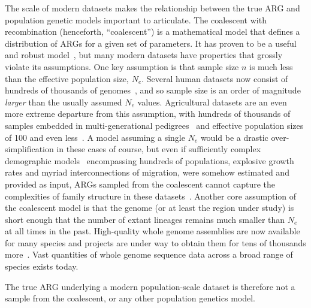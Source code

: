 \documentclass{article}
\begin{document}
The scale of modern datasets makes the
relationship between the true ARG and
population genetic models important to articulate.
The coalescent with recombination (henceforth, ``coalescent'')
is a mathematical model that defines a distribution of ARGs
for a given set of parameters.
It has proven to be a useful and robust
model~\citep{wakeley2012gene,bhaskar2014distortion,nelson2020accounting},
but many modern datasets have properties that grossly
violate its assumptions.
One key assumption is that
sample size $n$ is much less than the effective population size, $N_e$.
Several human datasets now consist of hundreds of thousands of
genomes~\citep{turnbull2018hundred, bycroft2018genome,
karczewski2020mutational,tanjo2021practical,
halldorsson2022sequences},
and so sample size is an order of magnitude \emph{larger} than the
usually assumed $N_e$ values.
Agricultural datasets are an even more extreme departure from this
assumption, with hundreds of thousands of samples embedded in
multi-generational pedigrees~\citep{hayes20191000,Ros-Freixedes2020}
and effective population sizes of 100 and even
less~\citep{MacLeod2013,Makanjuola2020,Hall2016,Porcnic2016}.
A model assuming a single $N_e$ would be a
drastic over-simplification in these cases of course, but
even if sufficiently complex demographic models~\citep{gower2022demes}
encompassing hundreds of populations, explosive growth rates and myriad
interconnections of migration, were somehow estimated and provided as input,
ARGs sampled from the coalescent cannot capture the complexities
of family structure in these
datasets~\citep[e.g.][]{turnbull2018hundred,Ros-Freixedes2020}.
Another core assumption of the coalescent model is that the genome
(or at least the region under study) is short enough that the number of extant
lineages remains much smaller than $N_e$ at all times in the past.
High-quality whole genome assemblies are now available
for many species %
and projects are under way to obtain
them for tens of thousands more~\citep{darwin2022sequence,lewin2022earth}.
Vast quantities of whole genome sequence data across a broad range
of species exists today.

The true ARG underlying a modern population-scale dataset
is therefore not a sample from the coalescent, or any other
population genetics model.



\end{document}
